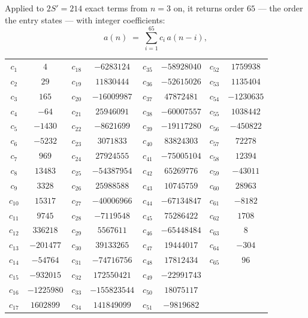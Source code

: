 \documentclass[11pt,a4paper]{article}
\theoremstyle{plain}
\theoremstyle{definition}
\begin{document}
Applied to $2S'=214$ exact terms from $n=3$ on, it returns order $65$ --- the
order the entry states --- with integer coefficients:
\[
a(n)\;=\;\sum_{i=1}^{65}c_i\,a(n-i),
\]
\begin{center}\small
\begin{tabular}{cccccccc}
$c_{1}$ & $4$ & $c_{18}$ & $-6283124$ & $c_{35}$ & $-58928040$ & $c_{52}$ & $1759938$ \\
$c_{2}$ & $29$ & $c_{19}$ & $11830444$ & $c_{36}$ & $-52615026$ & $c_{53}$ & $1135404$ \\
$c_{3}$ & $165$ & $c_{20}$ & $-16009987$ & $c_{37}$ & $47872481$ & $c_{54}$ & $-1230635$ \\
$c_{4}$ & $-64$ & $c_{21}$ & $25946091$ & $c_{38}$ & $-60007557$ & $c_{55}$ & $1038442$ \\
$c_{5}$ & $-1430$ & $c_{22}$ & $-8621699$ & $c_{39}$ & $-19117280$ & $c_{56}$ & $-450822$ \\
$c_{6}$ & $-5232$ & $c_{23}$ & $3071833$ & $c_{40}$ & $83824303$ & $c_{57}$ & $72278$ \\
$c_{7}$ & $969$ & $c_{24}$ & $27924555$ & $c_{41}$ & $-75005104$ & $c_{58}$ & $12394$ \\
$c_{8}$ & $13483$ & $c_{25}$ & $-54387954$ & $c_{42}$ & $65269776$ & $c_{59}$ & $-43011$ \\
$c_{9}$ & $3328$ & $c_{26}$ & $25988588$ & $c_{43}$ & $10745759$ & $c_{60}$ & $28963$ \\
$c_{10}$ & $15317$ & $c_{27}$ & $-40006966$ & $c_{44}$ & $-67134847$ & $c_{61}$ & $-8182$ \\
$c_{11}$ & $9745$ & $c_{28}$ & $-7119548$ & $c_{45}$ & $75286422$ & $c_{62}$ & $1708$ \\
$c_{12}$ & $336218$ & $c_{29}$ & $5567611$ & $c_{46}$ & $-65448484$ & $c_{63}$ & $8$ \\
$c_{13}$ & $-201477$ & $c_{30}$ & $39133265$ & $c_{47}$ & $19444017$ & $c_{64}$ & $-304$ \\
$c_{14}$ & $-54764$ & $c_{31}$ & $-74716756$ & $c_{48}$ & $17812434$ & $c_{65}$ & $96$ \\
$c_{15}$ & $-932015$ & $c_{32}$ & $172550421$ & $c_{49}$ & $-22991743$ &  &  \\
$c_{16}$ & $-1225980$ & $c_{33}$ & $-155823544$ & $c_{50}$ & $18075117$ &  &  \\
$c_{17}$ & $1602899$ & $c_{34}$ & $141849099$ & $c_{51}$ & $-9819682$ &  &  \\
\end{tabular}
\end{center}
\end{document}
